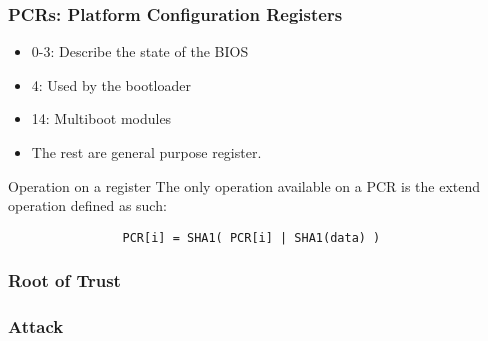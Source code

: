         \begin{frame}[fragile]
                \frametitle{PCRs: Platform Configuration Registers}
                \begin{itemize}
                        \item 0-3: Describe the state of the BIOS
                        \item 4: Used by the bootloader
                        \item 14: Multiboot modules
                        \item The rest are general purpose register.
                \end{itemize}
                
                \begin{block}{Operation on a register}
                The only operation available on a PCR is the extend
                operation defined as such:
                \begin{center}
                \begin{verbatim}
                PCR[i] = SHA1( PCR[i] | SHA1(data) )
                \end{verbatim}
                \end{center}
                \end{block}
\end{frame}

\subsubsection{Root of Trust}
\subsubsection{Attack}





